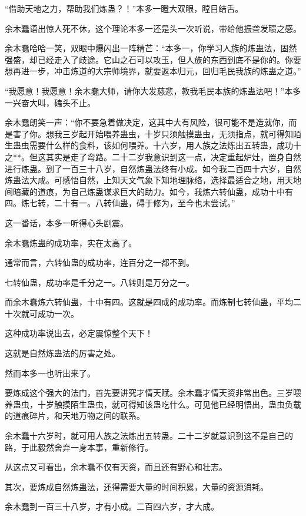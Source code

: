 \begin{this_body}
“借助天地之力，帮助我们炼蛊？！”本多一瞪大双眼，瞠目结舌。

余木蠢语出惊人死不休，这个理论本多一还是头一次听说，带给他振聋发聩之感。

余木蠢哈哈一笑，双眼中爆闪出一阵精芒：“本多一，你学习人族的炼蛊法，固然强盛，却已经走入了歧途。它山之石可以攻玉，但人族的东西到底不是你的。你要想再进一步，冲击炼道的大宗师境界，就要返本归元，回归毛民我族的炼蛊之道。”

“我愿意！我愿意！余木蠢大师，请你大发慈悲，教我毛民本族的炼蛊法吧！”本多一兴奋大叫，磕头不止。

余木蠢朗笑一声：“你不要急着做决定，这其中大有风险，很可能不是造就你，而是害了你。想我三岁起开始喂养蛊虫，十岁只须触摸蛊虫，无须指点，就可得知陌生蛊虫需要什么样的食料，该如何喂养。十六岁，用人族之法炼出五转蛊，成功十之**。但这其实是走了弯路。二十二岁我意识到这一点，决定重起炉灶，置身自然进行炼蛊。到了一百三十八岁，自然炼蛊法终有小成。如今我二百四十六岁，自然炼蛊法大成。可感悟自然，上知天文气象下知地理脉络，选择最适合之地，用天地间暗藏的道痕，为自己炼蛊谋求巨大的助力。如今，我炼六转仙蛊，成功十中有四。炼七转，二十有一。八转仙蛊，碍于修为，至今也未尝试。”

这一番话，本多一听得心头剧震。

余木蠢炼蛊的成功率，实在太高了。

通常而言，六转仙蛊的成功率，连百分之一都不到。

七转仙蛊，成功率是千分之一。八转则是万分之一。

而余木蠢炼六转仙蛊，十中有四。这就是四成的成功率。而炼制七转仙蛊，平均二十次就可成功一次。

这种成功率说出去，必定震惊整个天下！

这就是自然炼蛊法的厉害之处。

然而本多一也听出来了。

要炼成这个强大的法门，首先要讲究才情天赋。余木蠢才情天资非常出色。三岁喂养蛊虫，十岁触摸陌生蛊虫，就可得知该蛊吃什么。可见他已经明悟出，蛊虫负载的道痕碎片，和天地万物之间的联系。

余木蠢十六岁时，就可用人族之法炼出五转蛊。二十二岁就意识到这不是自己的路，于此毅然舍弃一身本事，重新修行。

从这点又可看出，余木蠢不仅有天资，而且还有野心和壮志。

其次，要炼成自然炼蛊法，还得需要大量的时间积累，大量的资源消耗。

余木蠢到一百三十八岁，才有小成。二百四六岁，才大成。


\end{this_body}
